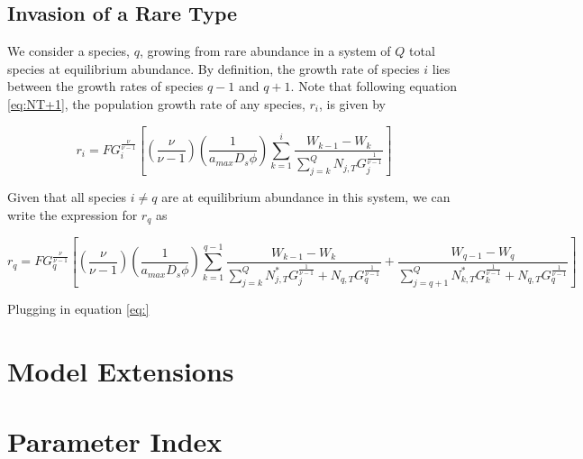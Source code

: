 \documentclass{article}
\begin{document}
  \subsection{Invasion of a Rare Type} \label{invasion when rare}

  We consider a species, $q$, growing from rare abundance in a system of $Q$ total
  species at equilibrium abundance. By definition, the growth rate of species
  $i$ lies between the growth rates of species $q-1$ and $q+1$. Note that following
  equation \ref{eq:NT+1}, the population growth rate of any species, $r_{i}$, is given by

  $$ r_{i} = F G_{i}^{\frac{\nu}{\nu - 1}}\left[ (\frac{\nu}{\nu-1})(\frac{1}{a_{max}D_{s}\phi}) \sum_{k = 1}^{i}\frac{W_{k -1} - W_{k}}{\sum_{j=k}^{Q}N_{j, T}G_{j}^{\frac{1}{\nu - 1}}} \right] $$

  Given that all species $i \neq q$ are at equilibrium abundance in this system,
  we can write the expression for $r_{q}$ as

  $$ r_{q} = F G_{q}^{\frac{\nu}{\nu - 1}}\left[ (\frac{\nu}{\nu-1})(\frac{1}{a_{max}D_{s}\phi}) \sum_{k = 1}^{q-1}\frac{W_{k -1} - W_{k}}{\sum_{j=k}^{Q}N_{j, T}^{*}G_{j}^{\frac{1}{\nu - 1}} + N_{q, T}G_{q}^{\frac{1}{\nu - 1}}} + \frac{W_{q-1} - W_{q}}{\sum_{j = q+1}^{Q}N_{k, T}^{*}G_{k}^{\frac{1}{\nu - 1}} + N_{q, T}G_{q}^{\frac{1}{\nu - 1}}} \right] $$

  Plugging in equation \ref{eq:}

  \section{Model Extensions}

  \section{Parameter Index} \label{variable dictionary}
\end{document}
